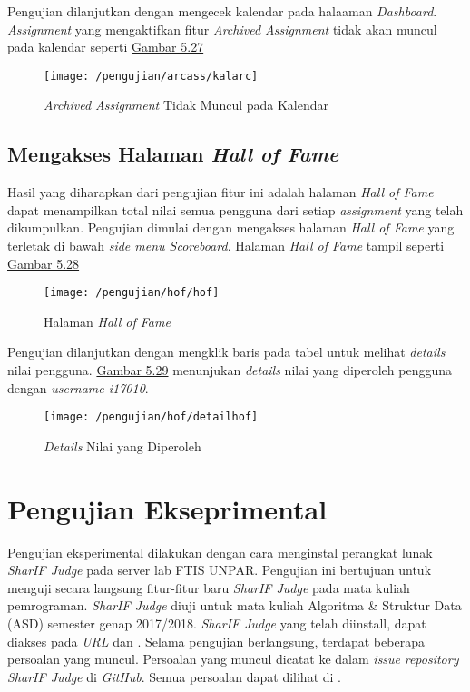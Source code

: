 	Pengujian dilanjutkan dengan mengecek kalendar pada halaaman \textit{Dashboard}. \textit{Assignment} yang mengaktifkan fitur \textit{Archived Assignment} tidak akan muncul pada kalendar seperti \hyperref[fig:kalarc]{Gambar 5.27}
	\begin{figure}[H]
		\centering  
		\texttt{[image: /pengujian/arcass/kalarc]}  
		\caption[\textit{Archived Assignment} Tidak Muncul pada Kalendar]{\textit{Archived Assignment} Tidak Muncul pada Kalendar} 
		\label{fig:kalarc} 
	\end{figure}

	\subsection{Mengakses Halaman \textit{Hall of Fame}}
	Hasil yang diharapkan dari pengujian fitur ini adalah halaman \textit{Hall of Fame} dapat menampilkan total nilai semua pengguna dari setiap \textit{assignment} yang telah dikumpulkan. Pengujian dimulai dengan mengakses halaman \textit{Hall of Fame} yang terletak di bawah \textit{side menu Scoreboard}. Halaman \textit{Hall of Fame} tampil seperti \hyperref[fig:halhof]{Gambar 5.28}
	\begin{figure}[H]
		\centering  
		\texttt{[image: /pengujian/hof/hof]}  
		\caption[Halaman \textit{Hall of Fame}]{Halaman \textit{Hall of Fame}} 
		\label{fig:halhof} 
	\end{figure}

	Pengujian dilanjutkan dengan mengklik baris pada tabel untuk melihat \textit{details} nilai pengguna. \hyperref[fig:dethof]{Gambar 5.29} menunjukan \textit{details} nilai yang diperoleh pengguna dengan \textit{username i17010}.
	\begin{figure}[H]
		\centering  
		\texttt{[image: /pengujian/hof/detailhof]}  
		\caption[\textit{Details} Nilai yang Diperoleh]{\textit{Details} Nilai yang Diperoleh} 
		\label{fig:dethof} 
	\end{figure}
	
\section{Pengujian Ekseprimental}
Pengujian eksperimental dilakukan dengan cara menginstal perangkat lunak \textit{SharIF Judge} pada server lab FTIS UNPAR. Pengujian ini bertujuan untuk menguji secara langsung fitur-fitur baru \textit{SharIF Judge} pada mata kuliah pemrograman. \textit{SharIF Judge} diuji untuk mata kuliah Algoritma \& Struktur Data (ASD) semester genap 2017/2018. \textit{SharIF Judge} yang telah diinstall, dapat diakses pada \textit{URL}  dan . Selama pengujian berlangsung, terdapat beberapa persoalan yang muncul. Persoalan yang muncul dicatat ke dalam \textit{issue} \textit{repository SharIF Judge} di \textit{GitHub}. Semua persoalan dapat dilihat di .

